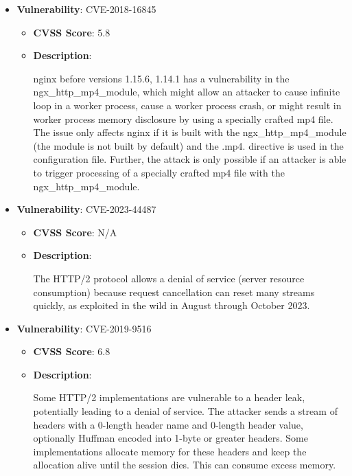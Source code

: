 \documentclass{article}
\begin{document}
\begin{itemize}
        \item \textbf{Vulnerability}: CVE-2018-16845
        \begin{itemize}
            \item \textbf{CVSS Score}:  5.8 
            \item \textbf{Description}:
            \parbox[t]{0.9\linewidth}{
                \ttfamily nginx before versions 1.15.6, 1.14.1 has a vulnerability in the ngx\_http\_mp4\_module, which might allow an attacker to cause infinite loop in a worker process, cause a worker process crash, or might result in worker process memory disclosure by using a specially crafted mp4 file. The issue only affects nginx if it is built with the ngx\_http\_mp4\_module (the module is not built by default) and the .mp4. directive is used in the configuration file. Further, the attack is only possible if an attacker is able to trigger processing of a specially crafted mp4 file with the ngx\_http\_mp4\_module.
            }
        \end{itemize}
    
        \item \textbf{Vulnerability}: CVE-2023-44487
        \begin{itemize}
            \item \textbf{CVSS Score}:  N/A 
            \item \textbf{Description}:
            \parbox[t]{0.9\linewidth}{
                \ttfamily The HTTP/2 protocol allows a denial of service (server resource consumption) because request cancellation can reset many streams quickly, as exploited in the wild in August through October 2023.
            }
        \end{itemize}
    
        \item \textbf{Vulnerability}: CVE-2019-9516
        \begin{itemize}
            \item \textbf{CVSS Score}:  6.8 
            \item \textbf{Description}:
            \parbox[t]{0.9\linewidth}{
                \ttfamily Some HTTP/2 implementations are vulnerable to a header leak, potentially leading to a denial of service. The attacker sends a stream of headers with a 0-length header name and 0-length header value, optionally Huffman encoded into 1-byte or greater headers. Some implementations allocate memory for these headers and keep the allocation alive until the session dies. This can consume excess memory.
            }
        \end{itemize}
    

\end{itemize}
\end{document}
